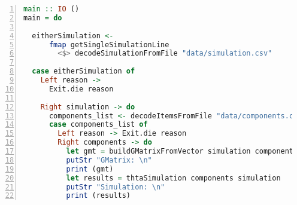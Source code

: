 \begin{lstlisting}[language=Haskell, numbers=left, caption={Main.hs file code}, captionpos=b, label={lst:maincompletecode}]
main :: IO ()
main = do

  eitherSimulation <-
      fmap getSingleSimulationLine
        <$> decodeSimulationFromFile "data/simulation.csv"

  case eitherSimulation of
    Left reason ->
      Exit.die reason

    Right simulation -> do
      components_list <- decodeItemsFromFile "data/components.csv"
      case components_list of
        Left reason -> Exit.die reason
        Right components -> do
          let gmt = buildGMatrixFromVector simulation components
          putStr "GMatrix: \n"
          print (gmt)
          let results = thtaSimulation components simulation
          putStr "Simulation: \n"
          print (results)

\end{lstlisting}


